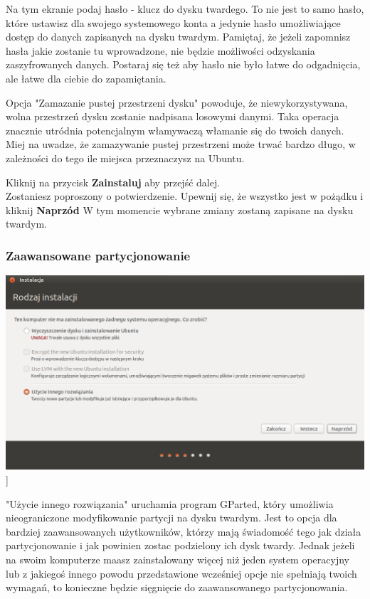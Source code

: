 Na tym ekranie podaj hasło - klucz do dysku twardego. To nie jest to samo hasło, które ustawisz dla swojego systemowego konta a jedynie hasło umożliwiające dostęp do danych zapisanych na dysku twardym. Pamiętaj, że jeżeli zapomnisz hasła jakie zostanie tu wprowadzone, nie będzie możliwości odzyskania zaszyfrowanych danych. Postaraj się też aby hasło nie było łatwe do odgadnięcia, ale łatwe dla ciebie do zapamiętania.

Opcja "Zamazanie pustej przestrzeni dysku" powoduje, że niewykorzystywana, wolna przestrzeń dysku zostanie nadpisana losowymi danymi. Taka operacja znacznie utródnia potencjalnym włamywaczą włamanie się do twoich danych. Miej na uwadze, że zamazywanie pustej przestrzeni może trwać bardzo długo, w zależności do tego ile miejsca przeznaczysz na Ubuntu.

\begin{flushright}
Kliknij na przycisk \textbf{Zainstaluj} aby przejść dalej.\\
Zostaniesz poproszony o potwierdzenie. Upewnij się, że wszystko jest w pożądku i kliknij \textbf{Naprzód}
W tym momencie wybrane zmiany zostaną zapisane na dysku twardym.\\
\end{flushright}
\clearpage

\subsubsection{Zaawansowane partycjonowanie}
\begin{center}
	\includegraphics[scale=0.5]{images/instalator_partycjonowanie_gparted1.png}]
\end{center}
"Użycie innego rozwiązania" uruchamia program GParted, który umożliwia nieograniczone modyfikowanie partycji na dysku twardym. Jest to opcja dla bardziej zaawansowanych użytkowników, którzy mają świadomość tego jak działa partycjonowanie i jak powinien zostac podzielony ich dysk twardy. Jednak jeżeli na swoim komputerze maasz zainstalowany więcej niż jeden system operacyjny lub z jakiegoś innego powodu przedstawione wcześniej opcje nie spełniają twoich wymagań, to konieczne będzie sięgnięcie do zaawansowanego partycjonowania.

